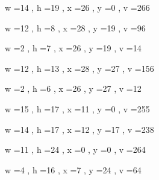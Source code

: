 \documentclass[11pt]{article}
\begin{document}
w =14 , h =19 , x =26 , y =0 , v =266
\par
w =12 , h =8 , x =28 , y =19 , v =96
\par
w =2 , h =7 , x =26 , y =19 , v =14
\par
w =12 , h =13 , x =28 , y =27 , v =156
\par
w =2 , h =6 , x =26 , y =27 , v =12
\par
w =15 , h =17 , x =11 , y =0 , v =255
\par
w =14 , h =17 , x =12 , y =17 , v =238
\par
w =11 , h =24 , x =0 , y =0 , v =264
\par
w =4 , h =16 , x =7 , y =24 , v =64
\par
\newpage
\end{document}
